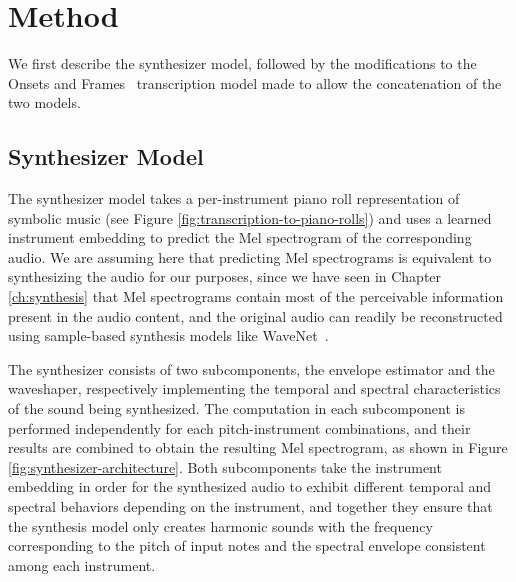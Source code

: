 \section{Method}

We first describe the synthesizer model, followed by the modifications to the Onsets and Frames~\cite{hawthorne2018onsetsframes} transcription model made to allow the concatenation of the two models.

\subsection{Synthesizer Model}

The synthesizer model takes a per-instrument piano roll representation of symbolic music (see Figure \ref{fig:transcription-to-piano-rolls}) and uses a learned instrument embedding to predict the Mel spectrogram of the corresponding audio.
We are assuming here that predicting Mel spectrograms is equivalent to synthesizing the audio for our purposes, since we have seen in Chapter \ref{ch:synthesis} that Mel spectrograms contain most of the perceivable information present in the audio content, and the original audio can readily be reconstructed using sample-based synthesis models like WaveNet~\cite{oord2016wavenet}.

The synthesizer consists of two subcomponents, the envelope estimator and the waveshaper, respectively implementing the temporal and spectral characteristics of the sound being synthesized.
The computation in each subcomponent is performed independently for each pitch-instrument combinations, and their results are combined to obtain the resulting Mel spectrogram, as shown in Figure \ref{fig:synthesizer-architecture}.
Both subcomponents take the instrument embedding in order for the synthesized audio to exhibit different temporal and spectral behaviors depending on the instrument, and together they ensure that the synthesis model only creates harmonic sounds with the frequency corresponding to the pitch of input notes and the spectral envelope consistent among each instrument.

